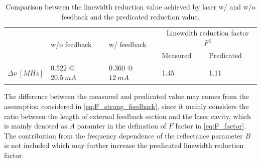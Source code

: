 \begin{table}[ht]
    \centering
    \caption{Comparison between the linewidth reduction value achieved by laser w/ and w/o feedback and the predicated reduction value.}
    \label{tab:linewidth_comparison}
    \begin{tabular}{@{}lllll@{}}
    \toprule
    \multirow{2}{*}{} & \multirow{2}{*}{w/o feedback} & \multirow{2}{*}{w/ feedback} & \multicolumn{2}{c}{Linewdith reduction factor $F^2$} \\
                      &                               &                              & Measured               & Predicated               \\ \midrule
    $\Delta\nu \ [MHz]$ & 0.522 @ $20.5 \ mA$              & 0.360 @ $12 \ mA$              & 1.45                     & 1.11                     \\ \bottomrule
    \end{tabular}
\end{table}

The difference between the measured and predicated value may comes from the assumption considered in \autoref{eq:F_strong_feedback}, since it mainly considers the ratio between the length of external feedback section and the laser cavity, which is mainly denoted as $A$ paramter in the defination of $F$ factor in \autoref{eq:F_factor}. The contribution from the frequency dependence of the reflectance parameter $B$ is not included which may further increase the predicated linewidth reduction factor.



